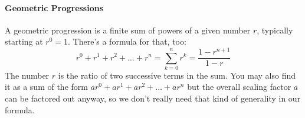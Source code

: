 








\paragraph{Geometric Progressions}
A geometric progression is a finite sum of powers of a given number $r$, typically starting at $r^0 = 1$. There's a formula for that, too:
\begin{equation}
 r^0 + r^1 + r^2 + \ldots + r^n = \sum_{k=0}^{n} r^k = \frac{1-r^{n+1}}{1 - r}
\end{equation}
The number $r$ is the ratio of two successive terms in the sum. You may also find it as a sum of the form $a r^0 + a r^1 + a r^2 + \ldots + a r^n$ but the overall scaling factor $a$ can be factored out anyway, so we don't really need that kind of generality in our formula.



